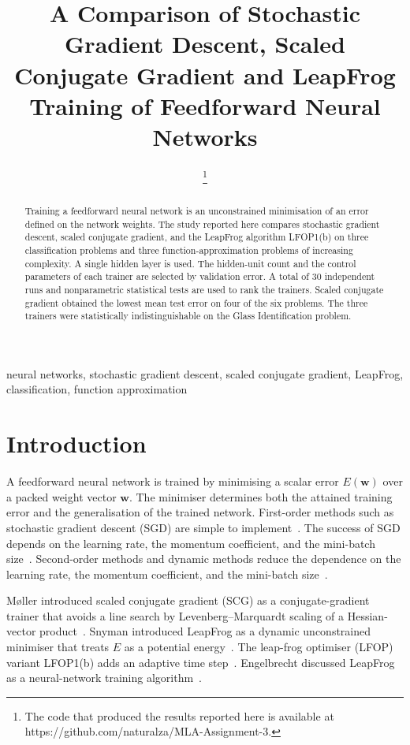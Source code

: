 \documentclass[conference,10pt]{IEEEtran}
\title{A Comparison of Stochastic Gradient Descent, Scaled Conjugate Gradient and LeapFrog Training of Feedforward Neural Networks}
\author{
\IEEEauthorblockN{Logan Shelver}
\IEEEauthorblockA{Student number: 26946777\\
RW741 Machine Learning\\
Department of Computer Science, Stellenbosch University\\
26946777@sun.ac.za}
\thanks{The code that produced the results reported here is available at https://github.com/naturalza/MLA-Assignment-3.}
}
\begin{document}
\maketitle

\begin{abstract}
Training a feedforward neural network is an unconstrained minimisation of an error defined on the network weights.
The study reported here compares stochastic gradient descent, scaled conjugate gradient, and the LeapFrog algorithm LFOP1(b) on three classification problems and three function-approximation problems of increasing complexity.
A single hidden layer is used.
The hidden-unit count and the control parameters of each trainer are selected by validation error.
A total of 30 independent runs and nonparametric statistical tests are used to rank the trainers.
Scaled conjugate gradient obtained the lowest mean test error on four of the six problems.
The three trainers were statistically indistinguishable on the Glass Identification problem.
\end{abstract}
\begin{IEEEkeywords}
neural networks, stochastic gradient descent, scaled conjugate gradient, LeapFrog, classification, function approximation
\end{IEEEkeywords}

\section{Introduction}
\label{sec:intro}
A feedforward neural network is trained by minimising a scalar error $E(\mathbf{w})$ over a packed weight vector $\mathbf{w}$.
The minimiser determines both the attained training error and the generalisation of the trained network.
First-order methods such as stochastic gradient descent (SGD) are simple to implement~\cite{lecun1998,rumelhart1986}.
The success of SGD depends on the learning rate, the momentum coefficient, and the mini-batch size~\cite{lecun1998,rumelhart1986}.
Second-order methods and dynamic methods reduce the dependence on the learning rate, the momentum coefficient, and the mini-batch size~\cite{moller1993,snyman1982}.

M{\o}ller introduced scaled conjugate gradient (SCG) as a conjugate-gradient trainer that avoids a line search by Levenberg--Marquardt scaling of a Hessian-vector product~\cite{moller1993}.
Snyman introduced LeapFrog as a dynamic unconstrained minimiser that treats $E$ as a potential energy~\cite{snyman1982}.
The leap-frog optimiser (LFOP) variant LFOP1(b) adds an adaptive time step~\cite{snyman1983}.
Engelbrecht discussed LeapFrog as a neural-network training algorithm~\cite{engelbrecht2007}.
\end{document}
